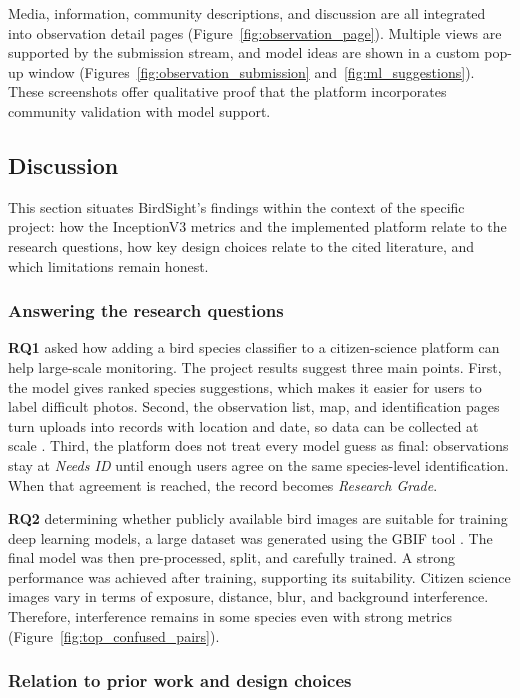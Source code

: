 Media, information, community descriptions, and discussion are all integrated into observation 
detail pages (Figure~\ref{fig:observation_page}). Multiple views are supported by the submission 
stream, and model ideas are shown in a custom pop-up window (Figures~\ref{fig:observation_submission} and~\ref{fig:ml_suggestions}). 
These screenshots offer qualitative proof that the platform incorporates community validation with model support.


\subsection{Discussion}

This section situates BirdSight's findings within the context of the specific project: how the 
InceptionV3 metrics and the implemented platform relate to the research questions, how key design 
choices relate to the cited literature, and which limitations remain honest.

\subsubsection{Answering the research questions}

\textbf{RQ1} asked how adding a bird species classifier to a citizen-science platform can help large-scale 
monitoring. The project results suggest three main points. First, the model gives ranked species suggestions, 
which makes it easier for users to label difficult photos. Second, the observation list, map, and 
identification pages turn uploads into records with location and date, so data can be collected at scale 
\cite{fraisl2022citizen}. Third, the platform does not treat every model guess as final: observations stay 
at \textit{Needs ID} until enough users agree on the same species-level identification. When that agreement 
is reached, the record becomes \textit{Research Grade}. 

\textbf{RQ2} determining whether publicly available bird images are suitable for training deep 
learning models, a large dataset was generated using the GBIF tool \cite{gbif2025}. The final model was then 
pre-processed, split, and carefully trained. A strong performance was achieved after training, supporting 
its suitability. Citizen science images vary in terms of exposure, distance, blur, and 
background interference. Therefore, interference remains in some species even with strong metrics 
(Figure~\ref{fig:top_confused_pairs}).

\subsubsection{Relation to prior work and design choices}

